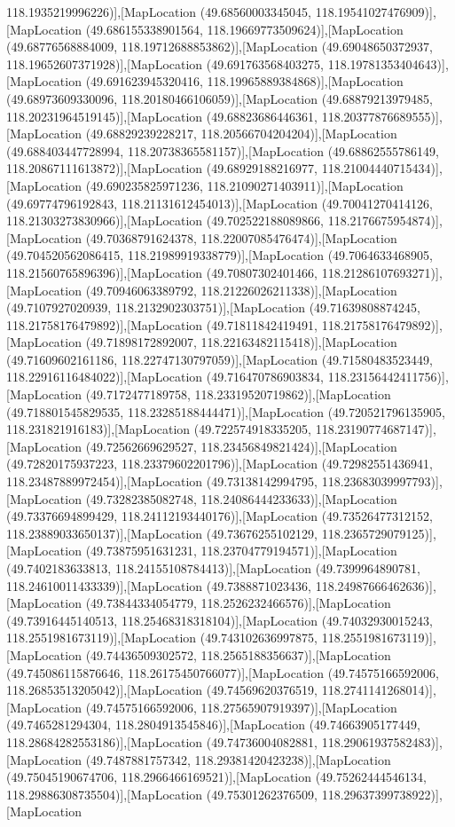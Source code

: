 118.1935219996226)],[MapLocation (49.68560003345045, 118.19541027476909)],[MapLocation (49.686155338901564, 118.19669773509624)],[MapLocation (49.68776568884009, 118.19712688853862)],[MapLocation (49.69048650372937, 118.19652607371928)],[MapLocation (49.691763568403275, 118.19781353404643)],[MapLocation (49.691623945320416, 118.19965889384868)],[MapLocation (49.68973609330096, 118.20180466106059)],[MapLocation (49.68879213979485, 118.20231964519145)],[MapLocation (49.68823686446361, 118.20377876689555)],[MapLocation (49.68829239228217, 118.20566704204204)],[MapLocation (49.688403447728994, 118.20738365581157)],[MapLocation (49.68862555786149, 118.20867111613872)],[MapLocation (49.68929188216977, 118.21004440715434)],[MapLocation (49.690235825971236, 118.21090271403911)],[MapLocation (49.69774796192843, 118.21131612454013)],[MapLocation (49.70041270414126, 118.21303273830966)],[MapLocation (49.702522188089866, 118.2176675954874)],[MapLocation (49.70368791624378, 118.22007085476474)],[MapLocation (49.704520562086415, 118.21989919338779)],[MapLocation (49.7064633468905, 118.21560765896396)],[MapLocation (49.70807302401466, 118.21286107693271)],[MapLocation (49.70946063389792, 118.21226026211338)],[MapLocation (49.7107927020939, 118.2132902303751)],[MapLocation (49.71639808874245, 118.21758176479892)],[MapLocation (49.71811842419491, 118.21758176479892)],[MapLocation (49.71898172892007, 118.22163482115418)],[MapLocation (49.71609602161186, 118.22747130797059)],[MapLocation (49.71580483523449, 118.22916116484022)],[MapLocation (49.716470786903834, 118.23156442411756)],[MapLocation (49.7172477189758, 118.23319520719862)],[MapLocation (49.718801545829535, 118.23285188444471)],[MapLocation (49.720521796135905, 118.231821916183)],[MapLocation (49.722574918335205, 118.23190774687147)],[MapLocation (49.72562669629527, 118.23456849821424)],[MapLocation (49.72820175937223, 118.23379602201796)],[MapLocation (49.72982551436941, 118.23487889972454)],[MapLocation (49.73138142994795, 118.23683039997793)],[MapLocation (49.73282385082748, 118.24086444233633)],[MapLocation (49.73376694899429, 118.24112193440176)],[MapLocation (49.73526477312152, 118.23889033650137)],[MapLocation (49.73676255102129, 118.2365729079125)],[MapLocation (49.73875951631231, 118.23704779194571)],[MapLocation (49.7402183633813, 118.24155108784413)],[MapLocation (49.7399964890781, 118.24610011433339)],[MapLocation (49.7388871023436, 118.24987666462636)],[MapLocation (49.73844334054779, 118.2526232466576)],[MapLocation (49.73916445140513, 118.25468318318104)],[MapLocation (49.74032930015243, 118.2551981673119)],[MapLocation (49.743102636997875, 118.2551981673119)],[MapLocation (49.74436509302572, 118.2565188356637)],[MapLocation (49.745086115876646, 118.26175450766077)],[MapLocation (49.74575166592006, 118.26853513205042)],[MapLocation (49.74569620376519, 118.2741141268014)],[MapLocation (49.74575166592006, 118.27565907919397)],[MapLocation (49.7465281294304, 118.2804913545846)],[MapLocation (49.74663905177449, 118.28684282553186)],[MapLocation (49.74736004082881, 118.29061937582483)],[MapLocation (49.7487881757342, 118.29381420423238)],[MapLocation (49.75045190674706, 118.2966466169521)],[MapLocation (49.75262444546134, 118.29886308735504)],[MapLocation (49.75301262376509, 118.29637399738922)],[MapLocation 